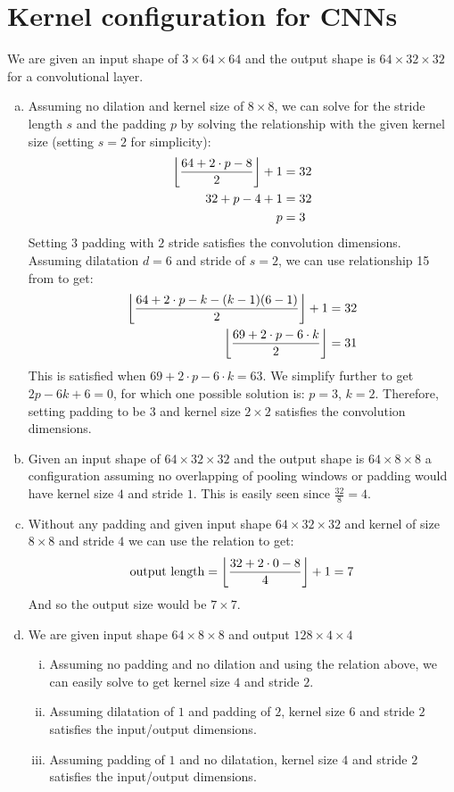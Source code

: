 \documentclass[paper=a4, fontsize=11pt]{scrartcl} %
\numberwithin{equation}{section} %
\numberwithin{figure}{section} %
\numberwithin{table}{section} %
\DeclarePairedDelimiter\floor{\lfloor}{\rfloor}
\begin{document}
\section{Kernel configuration for CNNs}
We are given an input shape of $3\times64\times64$ and the output shape
is $64\times32\times32$ for a convolutional layer.
\begin{enumerate}[(a)]
	\item Assuming no dilation and kernel size of $8\times8$, we can solve for the stride length $s$ and the padding $p$ by solving the relationship with the given kernel size (setting $s=2$ for simplicity):
	\begin{align*}
	\floor*{\frac{64+2\cdot p-8}{2}}+1&=32\\
	32+p-4+1&=32\\
	p&=3
	\end{align*}
	Setting $3$ padding with $2$ stride satisfies the convolution dimensions. Assuming dilatation $d=6$ and stride of $s=2$, we can use relationship 15 from \cite{journals/corr/DumoulinV16} to get:
	\begin{align*}
		\floor*{\frac{64+2\cdot p-k-(k-1)(6-1)}{2}}+1&=32\\
		\floor*{\frac{69+2\cdot p-6\cdot k}{2}}&=31\\
	\end{align*}
	This is satisfied when $69+2\cdot p-6\cdot k = 63$. We simplify further to get $2p-6k+6=0$, for which one possible solution is: $p=3$, $k=2$. Therefore, setting padding to be $3$ and kernel size $2\times2$ satisfies the convolution dimensions.
	\item Given an input shape of $64\times32 \times32$ and the output shape
	is $64\times8 \times8$ a configuration assuming no overlapping of pooling windows or padding would have kernel size $4$ and stride $1$. This is easily seen since $\frac{32}{8}=4$.
	\item Without any padding and given input shape $64\times32 \times32$ and kernel of size $8\times8$ and stride $4$ we can use the relation to get:
	$$\text{output length}=\floor*{\frac{32+2\cdot0-8}{4}}+1=7$$
	And so the output size would be $7\times7$.
	\item We are given input shape $64\times8 \times8$ and output $128\times4 \times4$
	\begin{enumerate}[(i)]
		\item Assuming no padding and no dilation and using the relation above, we can easily solve to get kernel size $4$ and stride $2$.
		\item Assuming dilatation of $1$ and padding of $2$, kernel size $6$ and stride $2$ satisfies the input/output dimensions.
		\item Assuming padding of $1$ and no dilatation, kernel size $4$ and stride $2$ satisfies the input/output dimensions.
	\end{enumerate}
\end{enumerate}
\end{document}
